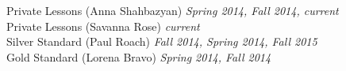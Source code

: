 Private Lessons (Anna Shahbazyan) \textit{Spring 2014, Fall 2014, current} \\
Private Lessons (Savanna Rose) \textit{current} \\
Silver Standard (Paul Roach) \textit{Fall 2014, Spring 2014, Fall 2015} \\
Gold Standard (Lorena Bravo) \textit{Spring 2014, Fall 2014}